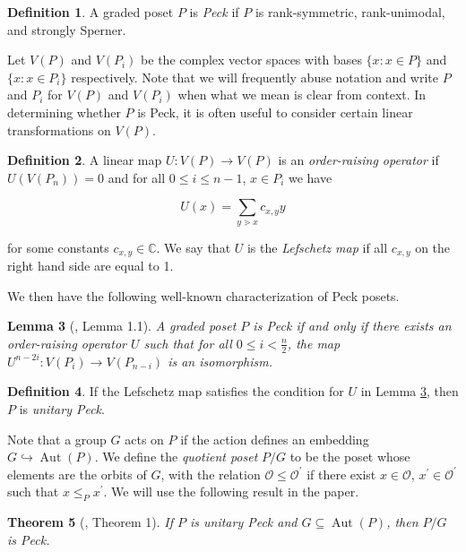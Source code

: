 \documentclass[smallextended, envcountsame, numbook]{svjour3}
\theoremstyle{plain}
\newtheorem{thm}{Theorem}[section]
\newtheorem{lem}[thm]{Lemma}
\theoremstyle{definition}
\newtheorem{defn}[thm]{Definition}
\theoremstyle{remark}
\numberwithin{equation}{section}
\newcommand\Aut{\operatorname{Aut}}
\begin{document}
\begin{defn}
	\label{defn:peck}
A graded poset $P$ is \textit{Peck} if $P$ is rank-symmetric, rank-unimodal, and strongly Sperner.
\end{defn}


Let $V(P)$ and $V(P_i)$ be the complex vector spaces with bases $\{x :x\in P\}$ and $\{x :x\in P_i\}$ respectively.  Note that we will frequently abuse notation and write $P$ and $P_i$ for $V(P)$ and $V(P_i)$ when what we mean is clear from context.  In determining whether $P$ is Peck, it is often useful to consider certain linear transformations on $V(P)$.

\begin{defn}
\label{defn:lefschetz}
A linear map $U\colon V(P)\rightarrow V(P)$ is an \textit{order-raising operator} if $U(V(P_n)) = 0$ and for all $0\le i\le n-1$, $x\in P_i$ we have

$$U(x) = \sum_{y\gtrdot x} c_{x,y}y$$

\noindent for some constants $c_{x,y}\in \mathbb{C}$.  We say that $U$ is the \textit{Lefschetz map} if all $c_{x,y}$ on the right hand side are equal to 1.
\end{defn}

\noindent We then have the following well-known characterization of Peck posets.

\begin{lem}[\cite{weyl_groups_stanley}, Lemma 1.1]\label{lem:Peck_poset_characterization}
A graded poset $P$ is Peck if and only if there exists an order-raising operator $U$ such that for all $0\le i < \frac{n}{2}$, the map $U^{n-2i}\colon V(P_i)\rightarrow V(P_{n-i})$ is an isomorphism.
\end{lem}

\begin{defn}
If the Lefschetz map satisfies the condition for $U$ in Lemma \ref{lem:Peck_poset_characterization}, then $P$ is \textit{unitary Peck}.
\end{defn}

Note that a group $G$ acts on $P$ if the action defines an embedding $G\hookrightarrow \Aut(P)$. We define the \textit{quotient poset} $P/G$ to be the poset whose elements are the orbits of $G$, with the relation $\mathcal{O}\le \mathcal{O}^\prime$ if there exist $x\in \mathcal{O}$, $x^\prime\in \mathcal{O}^\prime$ such that $x\le_{P} x^\prime$.  We will use the following result in the paper.

\begin{thm}[\cite{quotients_stanley}, Theorem 1]
\label{thm:quotients_of_unitary_peck_posets}
If $P$ is unitary Peck and $G\subseteq\Aut(P)$, then $P/G$ is Peck.
\end{thm}
\end{document}
